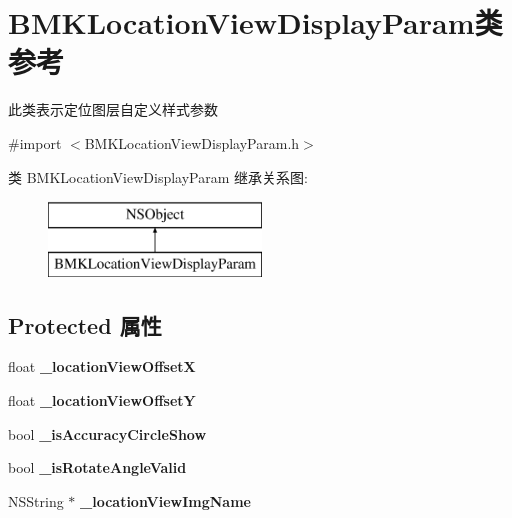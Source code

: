 \hypertarget{interface_b_m_k_location_view_display_param}{}\section{B\+M\+K\+Location\+View\+Display\+Param类 参考}
\label{interface_b_m_k_location_view_display_param}


此类表示定位图层自定义样式参数  




{\ttfamily \#import $<$B\+M\+K\+Location\+View\+Display\+Param.\+h$>$}

类 B\+M\+K\+Location\+View\+Display\+Param 继承关系图\+:\begin{figure}[H]
\begin{center}
\leavevmode
\includegraphics[height=2.000000cm]{interface_b_m_k_location_view_display_param}
\end{center}
\end{figure}
\subsection*{Protected 属性}
\begin{DoxyCompactItemize}
\item 
\hypertarget{interface_b_m_k_location_view_display_param_aca7d451721e1c1e3f75766fe3a3572e1}{}float {\bfseries \+\_\+location\+View\+Offset\+X}\label{interface_b_m_k_location_view_display_param_aca7d451721e1c1e3f75766fe3a3572e1}

\item 
\hypertarget{interface_b_m_k_location_view_display_param_a7914b096cec7ba724e9eb0b752c77dc0}{}float {\bfseries \+\_\+location\+View\+Offset\+Y}\label{interface_b_m_k_location_view_display_param_a7914b096cec7ba724e9eb0b752c77dc0}

\item 
\hypertarget{interface_b_m_k_location_view_display_param_a376ad9f3e561b1ff5c1fed963ffa62b8}{}bool {\bfseries \+\_\+is\+Accuracy\+Circle\+Show}\label{interface_b_m_k_location_view_display_param_a376ad9f3e561b1ff5c1fed963ffa62b8}

\item 
\hypertarget{interface_b_m_k_location_view_display_param_a9a113a1e0217f64e06311e752263d6e0}{}bool {\bfseries \+\_\+is\+Rotate\+Angle\+Valid}\label{interface_b_m_k_location_view_display_param_a9a113a1e0217f64e06311e752263d6e0}

\item 
\hypertarget{interface_b_m_k_location_view_display_param_a8cc611777402a8a9ca0fe3b12a48d87b}{}N\+S\+String $\ast$ {\bfseries \+\_\+location\+View\+Img\+Name}\label{interface_b_m_k_location_view_display_param_a8cc611777402a8a9ca0fe3b12a48d87b}

\end{DoxyCompactItemize}
